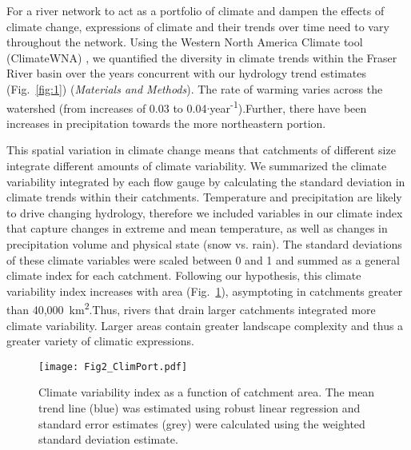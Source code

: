 \documentclass[9pt,twocolumn,twoside,lineno]{pnas-new}
\begin{document}
For a river network to act as a portfolio of climate and dampen the effects of climate change, expressions of climate and their trends over time need to vary throughout the network. Using the Western North America Climate tool (ClimateWNA) \cite{Wang:2016}, we quantified the diversity in climate trends within the Fraser River basin over the years concurrent with our hydrology trend estimates (Fig.~\ref{fig:1}) (\textit{Materials and Methods}). The rate of warming varies across the watershed (from increases of 0.03 to 0.04$\cdot$year\textsuperscript{-1}).Further, there have been increases in precipitation towards the more northeastern portion.

This spatial variation in climate change means that catchments of different size integrate different amounts of climate variability. We summarized the climate variability integrated by each flow gauge by calculating the standard deviation in climate trends within their catchments. Temperature and precipitation are likely to drive changing hydrology, therefore we included variables in our climate index that capture changes in extreme and mean temperature, as well as changes in precipitation volume and physical state (snow vs. rain). The standard deviations of these climate variables were scaled between 0 and 1 and summed as a general climate index for each catchment. Following our hypothesis, this climate variability index increases with area (Fig.~\ref{fig:2}), asymptoting in catchments greater than 40,000~km\textsuperscript{2}.Thus, rivers that drain larger catchments integrated more climate variability. Larger areas contain greater landscape complexity and thus a greater variety of climatic expressions.

\begin{figure}[h]
\centering
\texttt{[image: Fig2\_ClimPort.pdf]}
	\caption{Climate variability index as a function of catchment area. The mean trend line (blue) was estimated using robust linear regression and standard error estimates (grey) were calculated using the weighted standard deviation estimate.}
\label{fig:2}
\end{figure}
\end{document}
